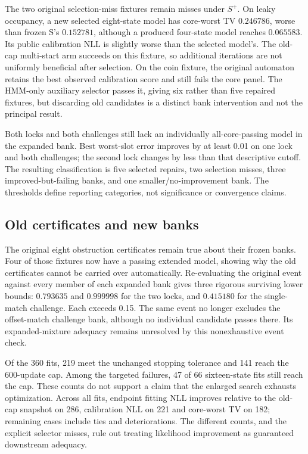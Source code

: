 
The two original selection-miss fixtures remain misses under $S^+$. On leaky occupancy, a new selected eight-state model has core-worst TV $0.246786$, worse than frozen S's $0.152781$, although a produced four-state model reaches $0.065583$. Its public calibration NLL is slightly worse than the selected model's. The old-cap multi-start arm succeeds on this fixture, so additional iterations are not uniformly beneficial after selection. On the coin fixture, the original automaton retains the best observed calibration score and still fails the core panel. The HMM-only auxiliary selector passes it, giving six rather than five repaired fixtures, but discarding old candidates is a distinct bank intervention and not the principal result.

Both locks and both challenges still lack an individually all-core-passing model in the expanded bank. Best worst-slot error improves by at least 0.01 on one lock and both challenges; the second lock changes by less than that descriptive cutoff. The resulting classification is five selected repairs, two selection misses, three improved-but-failing banks, and one smaller/no-improvement bank. The thresholds define reporting categories, not significance or convergence claims.

\subsection{Old certificates and new banks}\label{p3:s04}
The original eight obstruction certificates remain true about their frozen banks. Four of those fixtures now have a passing extended model, showing why the old certificates cannot be carried over automatically. Re-evaluating the original event against every member of each expanded bank gives three rigorous surviving lower bounds: $0.793635$ and $0.999998$ for the two locks, and $0.415180$ for the single-match challenge. Each exceeds 0.15. The same event no longer excludes the offset-match challenge bank, although no individual candidate passes there. Its expanded-mixture adequacy remains unresolved by this nonexhaustive event check.

Of the 360 fits, 219 meet the unchanged stopping tolerance and 141 reach the 600-update cap. Among the targeted failures, 47 of 66 sixteen-state fits still reach the cap. These counts do not support a claim that the enlarged search exhausts optimization. Across all fits, endpoint fitting NLL improves relative to the old-cap snapshot on 286, calibration NLL on 221 and core-worst TV on 182; remaining cases include ties and deteriorations. The different counts, and the explicit selector misses, rule out treating likelihood improvement as guaranteed downstream adequacy.

